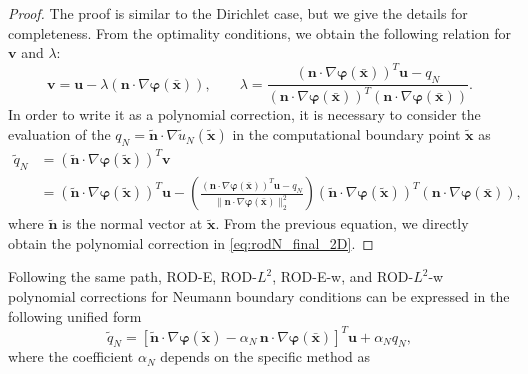 \documentclass{article}
\renewcommand{\phi}{\varphi}
\begin{document}
\begin{proof}
The proof is similar to the Dirichlet case, but we give the details for completeness. From the optimality conditions, we obtain the following relation for $\boldsymbol{v}$ and $\lambda$:
\begin{equation}
    \boldsymbol{v} = \boldsymbol{u} - \lambda  (\boldsymbol{n} \cdot \nabla \boldsymbol{\phi}(\bar{\boldsymbol{x}})), \qquad \lambda = \frac{(\boldsymbol{n} \cdot \nabla \boldsymbol{\phi}(\bar{\boldsymbol{x}}))^T \boldsymbol{u} - q_N}{(\boldsymbol{n} \cdot \nabla \boldsymbol{\phi}(\bar{\boldsymbol{x}}))^T(\boldsymbol{n} \cdot \nabla \boldsymbol{\phi}(\bar{\boldsymbol{x}}))} .
\end{equation}
%
In order to write it as a polynomial correction, it is necessary to consider the evaluation of the $q_N = \tilde{\boldsymbol{n}} \cdot \nabla \tilde u_N(\tilde{\boldsymbol{x}})$ in the computational boundary point $\tilde{\boldsymbol{x}}$ as
\begin{equation}
    \begin{split}
    \tilde q_N &= (\tilde{\boldsymbol{n}} \cdot \nabla \boldsymbol{\phi}(\tilde{\boldsymbol{x}}))^T \boldsymbol{v} \\
    &= (\tilde{\boldsymbol{n}} \cdot \nabla \boldsymbol{\phi}(\tilde{\boldsymbol{x}}))^T \boldsymbol{u} - \left( \frac{(\boldsymbol{n} \cdot \nabla \boldsymbol{\phi}(\bar{\boldsymbol{x}}))^T \boldsymbol{u} - q_N}{\|\boldsymbol{n} \cdot \nabla \boldsymbol{\phi}(\bar{\boldsymbol{x}})\|_2^2} \right) (\tilde{\boldsymbol{n}} \cdot \nabla \boldsymbol{\phi}(\tilde{\boldsymbol{x}}))^T (\boldsymbol{n} \cdot \nabla \boldsymbol{\phi}(\bar{\boldsymbol{x}})),
    \end{split}
\end{equation}
where $\tilde{\boldsymbol{n}}$ is the normal vector at $\tilde{\boldsymbol{x}}$. From the previous equation, we directly obtain the polynomial correction in \eqref{eq:rodN_final_2D}.

\end{proof}


Following the same path, ROD-E, ROD-$L^2$, ROD-E-w, and ROD-$L^2$-w polynomial corrections for Neumann boundary conditions can be expressed in the following unified form
\begin{equation}
    \tilde q_N = [\tilde{\boldsymbol{n}} \cdot \nabla \boldsymbol{\phi}(\tilde{\boldsymbol{x}}) - \alpha_N \,\boldsymbol{n} \cdot \nabla \boldsymbol{\phi}(\bar{\boldsymbol{x}})]^T \boldsymbol{u} + \alpha_N q_N,
\end{equation}
where the coefficient $\alpha_N$ depends on the specific method as
\end{document}
